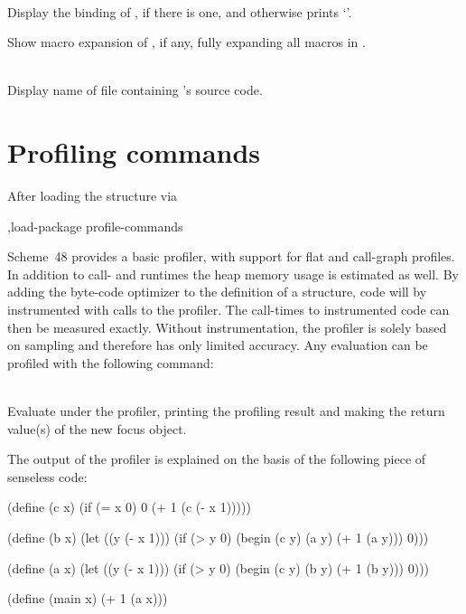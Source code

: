 \begin{description}
\item {}\\
    Display the binding of , if there is one, and otherwise
    prints `'.
 
\item {}
    Show macro expansion of , if any, fully expanding all 
    macros in .

\item {}\\
    Display name of file containing 's source code.
\end{description}


\section{Profiling commands}
\label{profiling-commands}

After loading the  structure via
%
\begin{example}
,load-package profile-commands  
\end{example}
%
Scheme~48 provides a basic profiler, with support for flat and call-graph profiles.
In addition to call- and runtimes the heap memory usage is estimated as well.
By adding the byte-code optimizer  to the definition
of a structure, code will by instrumented with calls to the profiler. The call-times to
instrumented code can then be measured exactly.
Without instrumentation, the profiler is solely based on sampling and therefore has only
limited accuracy.
Any evaluation can be profiled with the following command:

\begin{description}

\item {}\\
    Evaluate  under the profiler, printing the profiling result and making the
    return value(s) of  the new focus object.

\end{description}

The output of the profiler is explained on the basis of the following piece of senseless code:

\begin{example}
(define (c x)
  (if (= x 0)
      0
      (+ 1 (c (- x 1)))))

(define (b x)
  (let ((y (- x 1)))
    (if (> y 0)
        (begin
          (c y)
          (a y)
          (+ 1 (a y)))
        0)))

(define (a x)
  (let ((y (- x 1)))
    (if (> y 0)
        (begin
          (c y)
          (b y)
          (+ 1 (b y)))
        0)))

(define (main x)
  (+ 1 (a x)))
\end{example}

